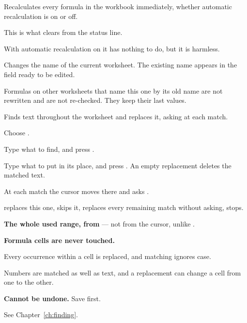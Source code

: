 
Recalculates every formula in the workbook immediately, whether automatic
recalculation is on or off.

\begin{ccsteps}
\item This is what clears  from the status line.
\item With automatic recalculation on it has nothing to do, but it is harmless.
\end{ccsteps}


Changes the name of the current worksheet. The existing name appears in the
field ready to be edited.

\begin{ccsteps}
\item Formulas on other worksheets that name this one by its old name are not
rewritten and are not re-checked. They keep their last values.
\end{ccsteps}


Finds text throughout the worksheet and replaces it, asking at each match.

\begin{ccprocedure}[]
\item Choose .
\item Type what to find, and press .
\item Type what to put in its place, and press . An empty
replacement deletes the matched text.
\item At each match the cursor moves there and \ccprod{} asks
.
\end{ccprocedure}

\begin{ccsteps}
\item {} replaces this one,  skips it,  replaces every
remaining match without asking,  stops.
\item \textbf{The whole used range, from } --- not from the cursor,
unlike .
\item \textbf{Formula cells are never touched.}
\item Every occurrence within a cell is replaced, and matching ignores case.
\item Numbers are matched as well as text, and a replacement can change a cell
from one to the other.
\item \textbf{Cannot be undone.} Save first.
\item See Chapter~\ref{ch:finding}.
\end{ccsteps}

